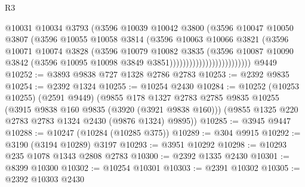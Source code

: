 \begin{lexlean}{R3}
\begin{coremodule}
                                      @10031
                                      @10034
                                      @3793
                                      (@3596
                                        @10039
                                        @10042
                                        @3800
                                        (@3596
                                          @10047
                                          @10050
                                          @3807
                                          (@3596
                                            @10055
                                            @10058
                                            @3814
                                            (@3596
                                              @10063
                                              @10066
                                              @3821
                                              (@3596
                                                @10071
                                                @10074
                                                @3828
                                                (@3596
                                                  @10079
                                                  @10082
                                                  @3835
                                                  (@3596
                                                    @10087
                                                    @10090
                                                    @3842
                                                    (@3596
                                                      @10095
                                                      @10098
                                                      @3849
                                                      @3851)))))))))))))))))))))))))
    @9449
@10252 := @3893 @9838 @727 @1328 @2786 @2783
@10253 := @2392 @9835
@10254 := @2392 @1324
@10255 := @10254 @2430
@10284 := @10252
    (@10253 @10255)
    (@2591 @9449)
    (@9855
      @178
      @1327
      @2783
      @2785
      @9835
      @10255
      (@3915 @9838 @160 @9835 (@3920 (@3921 @9838 @160)))
      (@9855 @1325 @220 @2783 @2783 @1324 @2430 (@9876 @1324) @9895))
@10285 := @3945 @9447
@10288 := @10247 (@10284 (@10285 @375))
@10289 := @304 @9915
@10292 := @3190 (@3194 @10289) @3197
@10293 := @3951 @10292
@10298 := @10293 @235 @1078 @1343 @2808 @2783
@10300 := @2392 @1335 @2430
@10301 := @8399 @10300
@10302 := @10254 @10301
@10303 := @2391 @10302
@10305 := @2392 @10303 @2430

\end{coremodule}
\end{lexlean}
